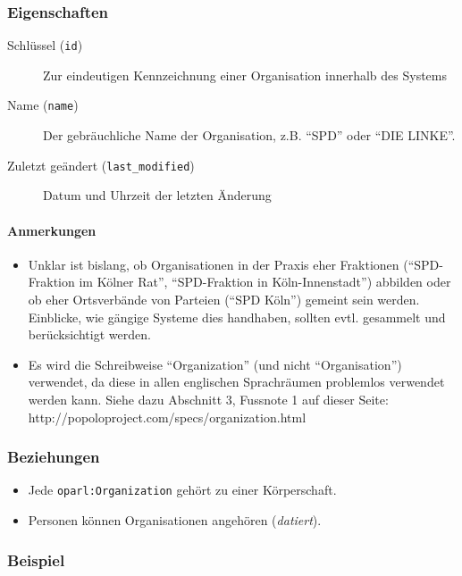 \documentclass[,a4paper]{article}
\begin{document}
\subsubsection{Eigenschaften}

\begin{description}
\item[Schlüssel (\texttt{id})]
Zur eindeutigen Kennzeichnung einer Organisation innerhalb des Systems
\item[Name (\texttt{name})]
Der gebräuchliche Name der Organisation, z.B. ``SPD'' oder ``DIE
LINKE''.
\item[Zuletzt geändert (\texttt{last\_modified})]
Datum und Uhrzeit der letzten Änderung
\end{description}

\paragraph{Anmerkungen}

\begin{itemize}
\item
  Unklar ist bislang, ob Organisationen in der Praxis eher Fraktionen
  (``SPD-Fraktion im Kölner Rat'', ``SPD-Fraktion in Köln-Innenstadt'')
  abbilden oder ob eher Ortsverbände von Parteien (``SPD Köln'') gemeint
  sein werden. Einblicke, wie gängige Systeme dies handhaben, sollten
  evtl. gesammelt und berücksichtigt werden.
\item
  Es wird die Schreibweise ``Organization'' (und nicht ``Organisation'')
  verwendet, da diese in allen englischen Sprachräumen problemlos
  verwendet werden kann. Siehe dazu Abschnitt 3, Fussnote 1 auf dieser
  Seite: http://popoloproject.com/specs/organization.html
\end{itemize}

\subsubsection{Beziehungen}

\begin{itemize}
\item
  Jede \texttt{oparl:Organization} gehört zu einer Körperschaft.
\item
  Personen können Organisationen angehören (\emph{datiert}).
\end{itemize}

\subsubsection{Beispiel}
\end{document}
